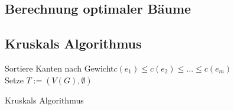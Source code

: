 \subsection{Berechnung optimaler Bäume}
\subsection*{Kruskals Algorithmus}
\begin{algorithm}
	\vspace*{5pt}
	Sortiere Kanten nach Gewicht\newline $c(e_1)\le c(e_2)\le ... \le c(e_m)$\\
	Setze $T:=(V(G), \emptyset)$\\
	{
	}
	\caption{Kruskals Algorithmus}
	\label{fig:Algorithmus}
\end{algorithm}
